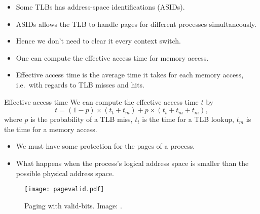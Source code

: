 \documentclass{beamer}
\begin{document}
\begin{frame}{\insertsubsectionhead}
  \begin{itemize}
    \item Some TLBs has address-space identifications (ASIDs).

    \item ASIDs allows the TLB to handle pages for different processes 
      simultaneously.

    \item Hence we don't need to clear it every context switch.

  \end{itemize}
\end{frame}

\begin{frame}{\insertsubsectionhead}
  \begin{itemize}
    \item One can compute the effective access time for memory access.

    \item Effective access time is the average time it takes for each memory 
      access, i.e.\ with regards to TLB misses and hits.

  \end{itemize}
\end{frame}

\begin{frame}{\insertsubsectionhead}
  \begin{block}{Effective access time}
    We can compute the effective access time \(t\) by \[
      t = (1-p)\times (t_t + t_m) + p\times (t_t + t_m + t_m),
    \] where \(p\) is the probability of a TLB miss, \(t_t\) is the time for 
    a TLB lookup, \(t_m\) is the time for a memory access.
  \end{block}
\end{frame}

\begin{frame}{\insertsubsectionhead}
  \begin{itemize}
    \item We must have some protection for the pages of a process.

    \item What happens when the process's logical address space is smaller than 
      the possible physical address space.
  \end{itemize}
\end{frame}

\begin{frame}{\insertsubsectionhead}
  \begin{figure}
    \texttt{[image: pagevalid.pdf]}
    \caption{Paging with valid-bits.
      Image: \cite{Silberschatz2013osc}.}
  \end{figure}
\end{frame}
\end{document}
